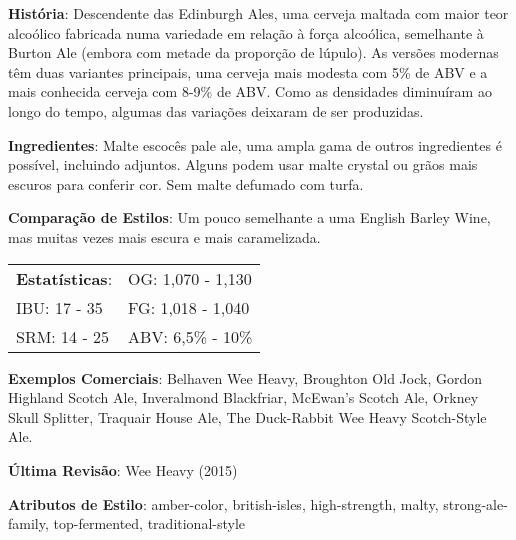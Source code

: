 \textbf{História}: Descendente das Edinburgh Ales, uma cerveja maltada com maior teor alcoólico fabricada numa variedade em relação à força alcoólica, semelhante à Burton Ale (embora com metade da proporção de lúpulo). As versões modernas têm duas variantes principais, uma cerveja mais modesta com 5\% de ABV e a mais conhecida cerveja com 8-9\% de ABV. Como as densidades diminuíram ao longo do tempo, algumas das variações deixaram de ser produzidas.

\textbf{Ingredientes}: Malte escocês pale ale, uma ampla gama de outros ingredientes é possível, incluindo adjuntos. Alguns podem usar malte crystal ou grãos mais escuros para conferir cor. Sem malte defumado com turfa.

\textbf{Comparação de Estilos}: Um pouco semelhante a uma English Barley Wine, mas muitas vezes mais escura e mais caramelizada.

\begin{tabular}{@{}p{35mm}p{35mm}@{}}
  \textbf{Estatísticas}: & OG: 1,070 - 1,130 \\
  IBU: 17 - 35  & FG: 1,018 - 1,040  \\
  SRM: 14 - 25  & ABV: 6,5\% - 10\%
\end{tabular}

\textbf{Exemplos Comerciais}: Belhaven Wee Heavy, Broughton Old Jock, Gordon Highland Scotch Ale, Inveralmond Blackfriar, McEwan's Scotch Ale, Orkney Skull Splitter, Traquair House Ale, The Duck-Rabbit Wee Heavy Scotch-Style Ale.

\textbf{Última Revisão}: Wee Heavy (2015)

\textbf{Atributos de Estilo}: amber-color, british-isles, high-strength, malty, strong-ale-family, top-fermented, traditional-style
